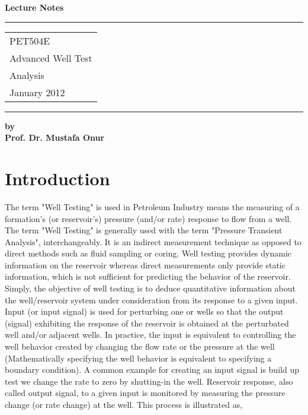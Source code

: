 \documentclass{llncs}
\begin{document}
\thispagestyle{empty}
\begin{flushleft}
\LARGE\bfseries Lecture Notes\\[1cm]
\end{flushleft}
\rule{\textwidth}{1pt}
\vspace{2pt}
\begin{flushright}
\Huge
\begin{tabular}{@{}l}
PET504E \\
Advanced Well Test \\
Analysis\\[6pt]
{\Large January 2012}
\end{tabular}
\end{flushright}
\rule{\textwidth}{1pt}

\begin{flushleft}
\LARGE\bfseries by\\ Prof. Dr. Mustafa Onur \\[2cm]

\end{flushleft}
\vfill


\section{Introduction}
%
The term "Well Testing" is used in Petroleum Industry means the measuring of a formation's
(or reservoir's) pressure (and/or rate) response to flow from a well. The term "Well Testing"
is generally used with the term "Pressure Transient Analysis", interchangeably. It is an indirect
measurement technique as opposed to direct methods such as fluid sampling or coring. Well testing
provides dynamic information on the reservoir whereas direct measurements only provide static
information, which is not sufficient for predicting the behavior of the reservoir.\\

Simply, the objective of well testing is to deduce quantitative information about the well/reservoir system
under consideration from its response to a given input. Input (or input signal) is used for perturbing one or
wells so that the output (signal) exhibiting the response of the reservoir is obtained at the perturbated well and/or
adjacent wells. In practice, the input is equivalent to controlling the well behavior  created by changing
the flow rate or the pressure at the well (Mathematically specifying the well behavior is equivalent to specifying 
a boundary condition). A common example for creating an input signal is  build up test 
 we change the rate to zero by shutting-in the well. Reservoir response,
 also called output signal, to a given input is monitored by measuring the
pressure change (or rate change) at the   well. This process is illustrated as,
\end{document}
